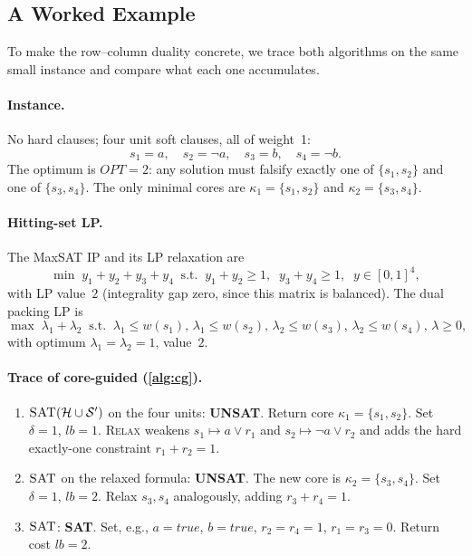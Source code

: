 \subsection{A Worked Example}
\label{sec:example}

To make the row--column duality concrete, we trace both algorithms on the
same small instance and compare what each one accumulates.

\paragraph{Instance.} No hard clauses; four unit soft clauses, all of
weight~1:
\[
  s_1 = a,\quad s_2 = \neg a,\quad s_3 = b,\quad s_4 = \neg b.
\]
The optimum is $\mathit{OPT} = 2$: any solution must falsify exactly one of
$\{s_1, s_2\}$ and one of $\{s_3, s_4\}$. The only minimal cores are
$\kappa_1 = \{s_1, s_2\}$ and $\kappa_2 = \{s_3, s_4\}$.

\paragraph{Hitting-set LP.} The MaxSAT IP and its LP relaxation are
\[
  \min\; y_1+y_2+y_3+y_4
  \;\;\text{s.t.}\;\; y_1+y_2 \geq 1,\;\; y_3+y_4 \geq 1,\;\; y \in [0,1]^4,
\]
with LP value~$2$ (integrality gap zero, since this matrix is balanced). The
dual packing LP is
\[
  \max\; \lambda_1 + \lambda_2
  \;\;\text{s.t.}\;\; \lambda_1 \leq w(s_1),\, \lambda_1 \leq w(s_2),\,
  \lambda_2 \leq w(s_3),\, \lambda_2 \leq w(s_4),\, \lambda \geq 0,
\]
with optimum $\lambda_1 = \lambda_2 = 1$, value~$2$.

\paragraph{Trace of core-guided (\cref{alg:cg}).}
\begin{enumerate}
\item $\textsc{SAT}(\mathcal{H} \cup \mathcal{S}')$ on the four units:
\textbf{UNSAT}. Return core $\kappa_1 = \{s_1, s_2\}$. Set
$\delta = 1$, $\mathit{lb} = 1$. \textsc{Relax} weakens
$s_1 \mapsto a \vee r_1$ and $s_2 \mapsto \neg a \vee r_2$ and adds the hard
exactly-one constraint $r_1 + r_2 = 1$.
\item $\textsc{SAT}$ on the relaxed formula: \textbf{UNSAT}. The new core
is $\kappa_2 = \{s_3, s_4\}$. Set $\delta = 1$, $\mathit{lb} = 2$. Relax
$s_3, s_4$ analogously, adding $r_3 + r_4 = 1$.
\item $\textsc{SAT}$: \textbf{SAT}. Set, e.g., $a = \mathit{true}$,
$b = \mathit{true}$, $r_2 = r_4 = 1$, $r_1 = r_3 = 0$. Return cost
$\mathit{lb} = 2$.
\end{enumerate}

